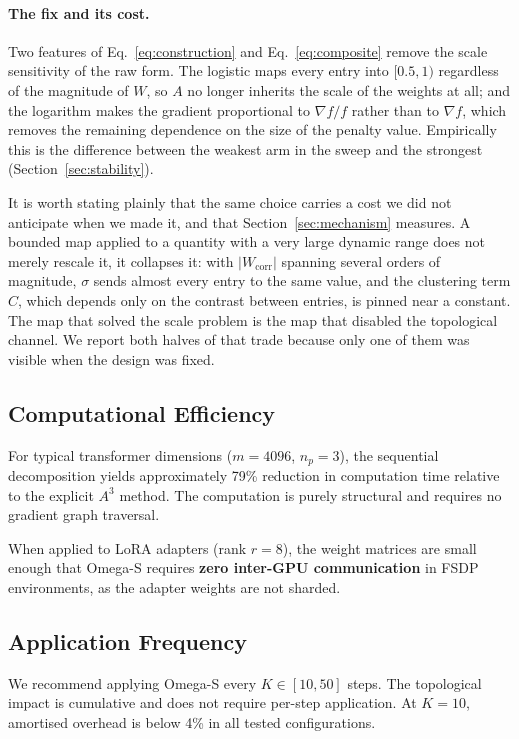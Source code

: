 \documentclass[11pt,a4paper]{article}
\begin{document}
\paragraph{The fix and its cost.} Two features of Eq.~\ref{eq:construction}
and Eq.~\ref{eq:composite} remove the scale sensitivity of the raw form. The
logistic maps every entry into $[0.5,1)$ regardless of the magnitude of
$W$, so $A$ no longer inherits the scale of the weights at all; and the
logarithm makes the gradient proportional to $\nabla f / f$ rather than to
$\nabla f$, which removes the remaining dependence on the size of the penalty
value. Empirically this is the difference between the weakest arm in the sweep
and the strongest (Section~\ref{sec:stability}).

It is worth stating plainly that the same choice carries a cost we did not
anticipate when we made it, and that Section~\ref{sec:mechanism} measures. A
bounded map applied to a quantity with a very large dynamic range does not
merely rescale it, it collapses it: with $|W_{\text{corr}}|$ spanning several
orders of magnitude, $\sigma$ sends almost every entry to the same value, and
the clustering term $C$, which depends only on the contrast between entries,
is pinned near a constant. The map that solved the scale problem is the map
that disabled the topological channel. We report both halves of that trade
because only one of them was visible when the design was fixed.

\subsection{Computational Efficiency}

For typical transformer dimensions ($m = 4096$, $n_p = 3$), the sequential
decomposition yields approximately 79\% reduction in computation time
relative to the explicit $A^3$ method. The computation is purely structural
and requires no gradient graph traversal.

When applied to LoRA adapters (rank $r = 8$), the weight matrices are small
enough that Omega-S requires \textbf{zero inter-GPU communication} in FSDP
environments, as the adapter weights are not sharded.

\subsection{Application Frequency}

We recommend applying Omega-S every $K \in [10, 50]$ steps. The
topological impact is cumulative and does not require per-step application.
At $K = 10$, amortised overhead is below 4\% in all tested configurations.
\end{document}
